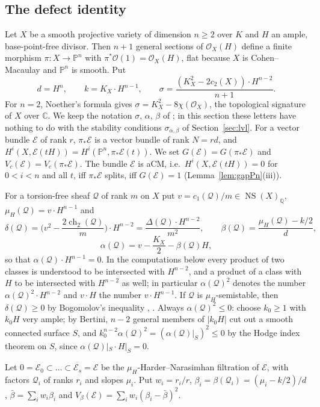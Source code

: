 \documentclass[11pt]{amsart}
\theoremstyle{definition}
\theoremstyle{remark}
\newcommand{\PP}{\mathbb{P}}
\newcommand{\QQ}{\mathbb{Q}}
\newcommand{\OO}{\mathcal{O}}
\newcommand{\cE}{\mathcal{E}}
\newcommand{\cQ}{\mathcal{Q}}
\begin{document}
\subsection{The defect identity}
Let $X$ be a smooth projective variety of dimension $n\ge2$ over $K$ and $H$ an ample, base-point-free divisor. Then $n+1$ general sections of $\OO_X(H)$ define a finite morphism $\pi\colon X\to\PP^n$ with $\pi^*\OO(1)=\OO_X(H)$, flat because $X$ is Cohen--Macaulay and $\PP^n$ is smooth. Put
\[
d=H^n,\qquad k=K_X\cdot H^{n-1},\qquad \sigma=\frac{(K_X^2-2c_2(X))\cdot H^{n-2}}{n+1}.
\]
For $n=2$, Noether's formula gives $\sigma=K_X^2-8\chi(\OO_X)$, the topological signature of $X$ over $\mathbb C$. We keep the notation $\sigma$, $\alpha$, $\beta$ of \cite{An1,An2}; in this section these letters have nothing to do with the stability conditions $\sigma_{\alpha,\beta}$ of Section~\ref{sec:lvl}. For a vector bundle $\cE$ of rank $r$, $\pi_*\cE$ is a vector bundle of rank $N=rd$, and $H^i(X,\cE(tH))=H^i(\PP^n,\pi_*\cE(t))$. We set $G(\cE)=G(\pi_*\cE)$ and $V_c(\cE)=V_c(\pi_*\cE)$. The bundle $\cE$ is aCM, i.e.\ $H^i(X,\cE(tH))=0$ for $0<i<n$ and all $t$, iff $\pi_*\cE$ splits, iff $G(\cE)=1$ (Lemma~\ref{lem:gapPn}(iii)).

For a torsion-free sheaf $\cQ$ of rank $m$ on $X$ put $v=c_1(\cQ)/m\in\operatorname{NS}(X)_\QQ$, $\mu_H(\cQ)=v\cdot H^{n-1}$ and
\[
\delta(\cQ)=\Big(v^2-\frac{2\operatorname{ch}_2(\cQ)}m\Big)\cdot H^{n-2}=\frac{\Delta(\cQ)\cdot H^{n-2}}{m^2},\qquad
\beta(\cQ)=\frac{\mu_H(\cQ)-k/2}d,
\]
\[
\alpha(\cQ)=v-\frac{K_X}2-\beta(\cQ)H ,
\]
so that $\alpha(\cQ)\cdot H^{n-1}=0$. In the computations below every product of two classes is understood to be intersected with $H^{n-2}$, and a product of a class with $H$ to be intersected with $H^{n-2}$ as well; in particular $\alpha(\cQ)^2$ denotes the number $\alpha(\cQ)^2\cdot H^{n-2}$ and $v\cdot H$ the number $v\cdot H^{n-1}$. If $\cQ$ is $\mu_H$-semistable, then $\delta(\cQ)\ge0$ by Bogomolov's inequality \cite{Bo78}, \cite[Thm.~7.3.1]{HL10}. Always $\alpha(\cQ)^2\le0$: choose $k_0\ge1$ with $k_0H$ very ample; by Bertini, $n-2$ general members of $|k_0H|$ cut out a smooth connected surface $S$, and $k_0^{n-2}\alpha(\cQ)^2=(\alpha(\cQ)|_S)^2\le0$ by the Hodge index theorem on $S$, since $\alpha(\cQ)|_S\cdot H|_S=0$.

Let $0=\cE_0\subset\dots\subset\cE_s=\cE$ be the $\mu_H$-Harder--Narasimhan filtration of $\cE$, with factors $\cQ_i$ of ranks $r_i$ and slopes $\mu_i$. Put $w_i=r_i/r$, $\beta_i=\beta(\cQ_i)=(\mu_i-k/2)/d$, $\bar\beta=\sum_iw_i\beta_i$ and $V_\beta(\cE)=\sum_iw_i(\beta_i-\bar\beta)^2$.
\end{document}
